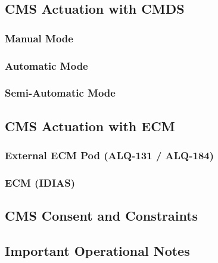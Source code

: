 \documentclass[11pt, a4paper, twoside]{report}
\begin{document}
\subsection{CMS Actuation with CMDS}
\label{sec:C5-S2-S1}

\subsubsection{Manual Mode}
\label{sec:C5-S2-S1-S1}

\subsubsection{Automatic Mode}
\label{sec:C5-S2-S1-S2}

\subsubsection{Semi-Automatic Mode}
\label{sec:C5-S2-S1-S3}

\subsection{CMS Actuation with ECM}
\label{sec:C5-S2-S2}

\subsubsection{External ECM Pod (ALQ-131 / ALQ-184)}
\label{sec:C5-S2-S2-S1}

\subsubsection{ECM (IDIAS)}
\label{sec:C5-S2-S2-S2}

\subsection{CMS Consent and Constraints}
\label{sec:C5-S2-S3}

\subsection{Important Operational Notes}
\label{sec:C5-S2-S4}
\end{document}
